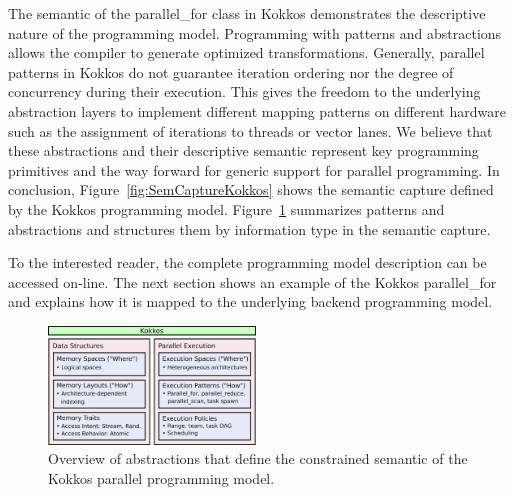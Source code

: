 The semantic of the parallel\_for class in Kokkos demonstrates the descriptive nature of the programming model. Programming with patterns and abstractions allows the compiler to generate optimized transformations. 
Generally, parallel patterns in Kokkos do not guarantee iteration ordering nor the degree of concurrency during their execution. This gives the freedom to the underlying abstraction layers to implement different mapping patterns on different hardware such as the assignment of iterations to threads or vector lanes. We believe that these abstractions and their descriptive semantic represent key programming primitives and the way forward for generic support for parallel programming. In conclusion, Figure~\ref{fig:SemCaptureKokkos} shows the semantic capture defined by the Kokkos programming model. Figure~\ref{fig:abstractions} summarizes patterns and abstractions and structures them by information type in the semantic capture.

To the interested reader, the complete programming model description can be accessed on-line\cite{KOKKOS_WIKI}.
The next section shows an example of the Kokkos parallel\_for and explains how it is mapped to the underlying backend programming model.

\begin{figure}
\centerline{\includegraphics[width=0.49\textwidth]{img/Abstractions.png}}
\caption{Overview of abstractions that define the constrained semantic of the Kokkos parallel programming model.}
\label{fig:abstractions}
\end{figure}
